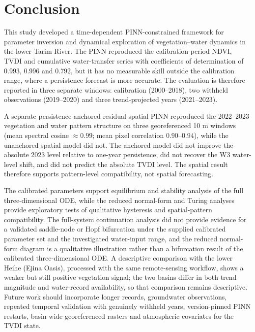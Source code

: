 \documentclass[preprint,review,12pt,3p]{elsarticle}
\begin{document}
\section{Conclusion}

	This study developed a time-dependent PINN-constrained framework for parameter inversion and dynamical exploration of vegetation--water dynamics in the lower Tarim River. The PINN reproduced the calibration-period NDVI, TVDI and cumulative water-transfer series with coefficients of determination of 0.993, 0.996 and 0.792, but it has no measurable skill outside the calibration range, where a persistence forecast is more accurate. The evaluation is therefore reported in three separate windows: calibration (2000--2018), two withheld observations (2019--2020) and three trend-projected years (2021--2023).

	A separate persistence-anchored residual spatial PINN reproduced the 2022--2023 vegetation and water pattern structure on three georeferenced 10 m windows (mean spectral cosine $\approx0.99$; mean pixel correlation $0.90$--$0.94$), while the unanchored spatial model did not. The anchored model did not improve the absolute 2023 level relative to one-year persistence, did not recover the W3 water-level shift, and did not predict the absolute TVDI level. The spatial result therefore supports pattern-level compatibility, not spatial forecasting.

The calibrated parameters support equilibrium and stability analysis of the full three-dimensional ODE, while the reduced normal-form and Turing analyses provide exploratory tests of qualitative hysteresis and spatial-pattern compatibility. The full-system continuation analysis did not provide evidence for a validated saddle-node or Hopf bifurcation under the supplied calibrated parameter set and the investigated water-input range, and the reduced normal-form diagram is a qualitative illustration rather than a bifurcation result of the calibrated three-dimensional ODE. A descriptive comparison with the lower Heihe (Ejina Oasis), processed with the same remote-sensing workflow, shows a weaker but still positive vegetation signal; the two basins differ in both trend magnitude and water-record availability, so that comparison remains descriptive. Future work should incorporate longer records, groundwater observations, repeated temporal validation with genuinely withheld years, version-pinned PINN restarts, basin-wide georeferenced rasters and atmospheric covariates for the TVDI state.
	
\end{document}
